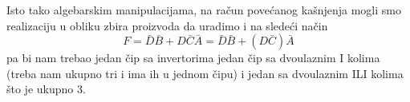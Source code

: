 \begin{frame}[label=02-s047]
Isto tako algebarskim manipulacijama, na račun povećanog kašnjenja mogli smo realizaciju u obliku zbira proizvoda da uradimo i na sledeći način
\[
F=\bar D\bar B+D\bar C\bar A=\bar D\bar B+(D\bar C)\bar A
\]
pa bi nam trebao jedan čip sa invertorima jedan čip sa dvoulaznim I kolima (treba nam ukupno tri i ima ih u jednom čipu) i jedan sa dvoulaznim ILI kolima što je ukupno 3.
\end{frame}
